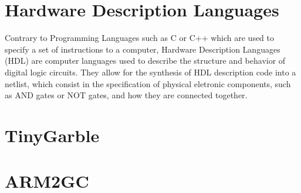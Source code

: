 \section{Hardware Description Languages}
Contrary to Programming Languages such as C or C++ which are used to specify a set of instructions to a computer, Hardware Description Languages (HDL) are computer languages used to describe the structure and behavior of digital logic circuits. They allow for the synthesis of HDL description code into a netlist, which consist in the specification of physical eletronic components, such as AND gates or NOT gates, and how they are connected together.

\section{TinyGarble}


\section{ARM2GC}


 